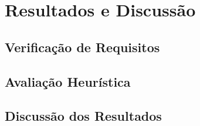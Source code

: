 

\chapter{Resultados e Discussão}\label{cha:resultados}

\section{Verificação de Requisitos}

\section{Avaliação Heurística}

\section{Discussão dos Resultados}
